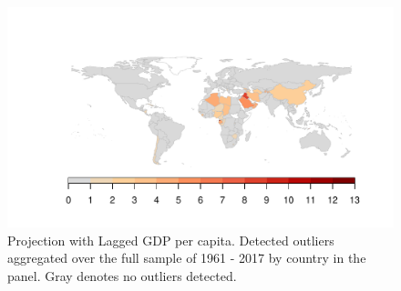 \documentclass[11pt, letterpaper]{article}
\numberwithin{algorithm}{section}
\numberwithin{assumption}{section}
\numberwithin{lemma}{section}
\numberwithin{theorem}{section}
\numberwithin{corollary}{section}
\numberwithin{remark}{section}
\numberwithin{equation}{section}
\numberwithin{figure}{section}
\numberwithin{table}{section}
\begin{document}
\begin{figure}[!htbp]  \vspace{-.35in}
\centering
\includegraphics[width = \textwidth]{ctry_map_adapt.L1.pdf}
\caption{Projection with Lagged GDP per capita. Detected outliers aggregated over the full sample of 1961 - 2017 by country in the panel. Gray denotes no outliers detected. }
\label{fig_map_app1}
\end{figure}
\end{document}
